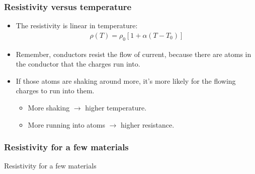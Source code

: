 \documentclass[aspectratio=169,
hyperref={colorlinks,urlcolor=blue}
]{beamer}
\begin{document}
\subsubsection{Resistivity versus temperature}
\label{subsubsec:resistivityversustemperature}
{
\begin{itemize}
\item The resistivity is linear in temperature:
\begin{align*}
\rho(T) = \rho_0\left[1+\alpha(T-T_0)\right]
\end{align*}
\item Remember, conductors resist the flow of current, because there are atoms in the conductor that the
charges run into.
\item If those atoms are shaking around more, it’s more likely for the flowing charges to run into them.
\begin{itemize}
\item More shaking $\rightarrow$ higher temperature.
\item More running into atoms $\rightarrow$ higher resistance.
\end{itemize}
\end{itemize}
}
{
\centering
{}
}


\subsubsection{Resistivity for a few materials}
\label{subsubsec:resistivityforafewmaterials}
\begin{frame}{Resistivity for a few materials}

\end{frame}
\end{document}
